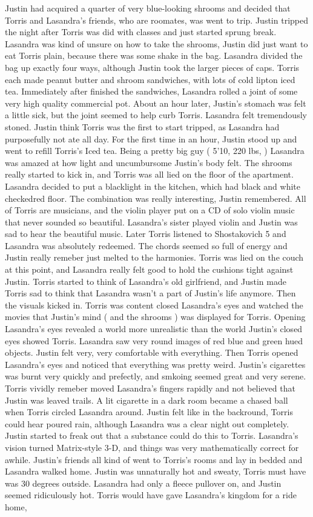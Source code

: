 \documentclass[12pt]{book}
\begin{document}
Justin had acquired a quarter of very blue-looking shrooms and decided that Torris and Lasandra's friends, who are roomates, was went to trip. Justin tripped the night after Torris was did with classes and just started sprung break. Lasandra was kind of unsure on how to take the shrooms, Justin did just want to eat Torris plain, because there was some shake in the bag. Lasandra divided the bag up exactly four ways, although Justin took the larger pieces of caps. Torris each made peanut butter and shroom sandwiches, with lots of cold lipton iced tea. Immediately after finished the sandwiches, Lasandra rolled a joint of some very high quality commercial pot. About an hour later, Justin's stomach was felt a little sick, but the joint seemed to help curb Torris. Lasandra felt tremendously stoned. Justin think Torris was the first to start tripped, as Lasandra had purposefully not ate all day. For the first time in an hour, Justin stood up and went to refill Torris's Iced tea. Being a pretty big guy ( 5'10, 220 lbs, ) Lasandra was amazed at how light and uncumbursome Justin's body felt. The shrooms really started to kick in, and Torris was all lied on the floor of the apartment. Lasandra decided to put a blacklight in the kitchen, which had black and white checkedred floor. The combination was really interesting, Justin remembered. All of Torris are musicians, and the violin player put on a CD of solo violin music that never sounded so beautiful. Lasandra's sister played violin and Justin was sad to hear the beautiful music. Later Torris listened to Shostakovich 5 and Lasandra was absolutely redeemed. The chords seemed so full of energy and Justin really remeber just melted to the harmonies. Torris was lied on the couch at this point, and Lasandra really felt good to hold the cushions tight against Justin. Torris started to think of Lasandra's old girlfriend, and Justin made Torris sad to think that Lasandra wasn't a part of Justin's life anymore. Then the visuals kicked in. Torris was content closed Lasandra's eyes and watched the movies that Justin's mind ( and the shrooms ) was displayed for Torris. Opening Lasandra's eyes revealed a world more unrealistic than the world Justin's closed eyes showed Torris. Lasandra saw very round images of red blue and green hued objects. Justin felt very, very comfortable with everything. Then Torris opened Lasandra's eyes and noticed that everything was pretty weird. Justin's cigarettes was burnt very quickly and prefectly, and smkoing seemed great and very serene. Torris vividly remeber moved Lasandra's fingers rapidly and not believed that Justin was leaved trails. A lit cigarette in a dark room became a chased ball when Torris circled Lasandra around. Justin felt like in the backround, Torris could hear poured rain, although Lasandra was a clear night out completely. Justin started to freak out that a substance could do this to Torris. Lasandra's vision turned Matrix-style 3-D, and things was very mathematically correct for awhile. Justin's friends all kind of went to Torris's rooms and lay in bedded and Lasandra walked home. Justin was unnaturally hot and sweaty, Torris must have was 30 degrees outside. Lasandra had only a fleece pullover on, and Justin seemed ridiculously hot. Torris would have gave Lasandra's kingdom for a ride home, 
\end{document}
